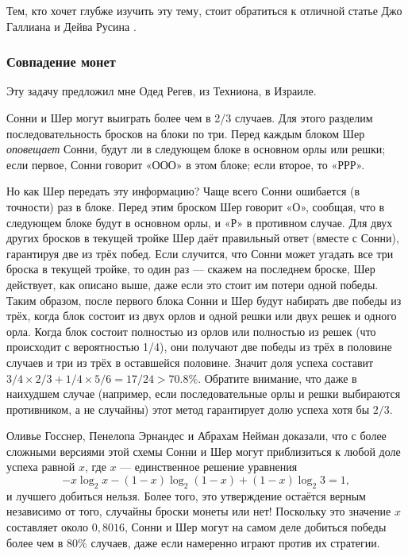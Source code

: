 Тем, кто хочет глубже изучить эту тему, стоит обратиться к отличной статье Джо Галлиана и Дейва Русина \cite{22}.

\subsubsection*{Совпадение монет}

Эту задачу предложил мне Одед Регев, из Техниона, в Израиле.

Сонни и Шер могут выиграть более чем в 2/3 случаев.
Для этого разделим последовательность бросков на блоки по три.
Перед каждым блоком Шер \emph{оповещает} Сонни, будут ли в следующем блоке в основном орлы или решки;
если первое, Сонни говорит «ООО» в этом блоке; если второе, то «РРР».

Но как Шер передать эту информацию?
Чаще всего Сонни ошибается (в точности) раз в блоке.
Перед этим броском Шер говорит «О», сообщая, что в следующем блоке будут в основном орлы, и «Р» в противном случае.
Для двух других бросков в текущей тройке Шер даёт правильный ответ (вместе с Сонни), гарантируя две из трёх побед.
Если случится, что Сонни может угадать все три броска в текущей тройке,
то один раз --- скажем на последнем броске, Шер действует, как описано выше, даже если это стоит им потери одной победы.
Таким образом, после первого блока Сонни и Шер будут набирать две победы из трёх, когда блок состоит из двух орлов и одной решки или двух решек и одного орла.
Когда блок состоит полностью из орлов или полностью из решек (что происходит с вероятностью 1/4), они получают две победы из трёх в половине случаев и три из трёх в оставшейся половине.
Значит доля успеха составит $3/4 \times 2/3 + 1/4 \times 5/6 = 17/24 > 70.8\%$.
Обратите внимание, что даже в наихудшем случае (например, если последовательные орлы и решки выбираются противником, а не случайны) этот метод гарантирует долю успеха хотя бы $2/3$.

Оливье Госснер, Пенелопа Эрнандес и Абрахам Нейман \cite{32} доказали, что с более сложными версиями этой схемы Сонни и Шер могут приблизиться к любой доле успеха равной $x$, где $x$ --- единственное решение уравнения
\[-x \log_2 x - (1 - x) \log_2 (1 - x) + (1 - x) \log_2 3 = 1,\]
и лучшего добиться нельзя.
Более того, это утверждение остаётся верным независимо от того, случайны броски монеты или нет!
Поскольку это значение $x$ составляет около $0{,}8016$, Сонни и Шер могут на самом деле добиться победы более чем в $80\%$ случаев, даже если намеренно играют против их стратегии.

